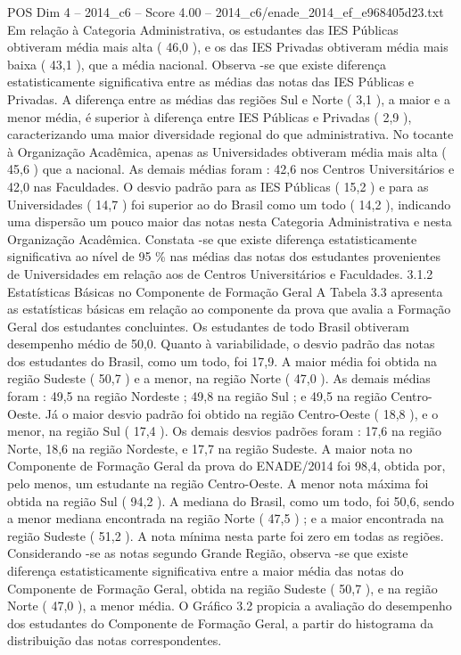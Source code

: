 \begin{textsample}{POS Dim 4 – 2014\_c6 – Score 4.00 – 2014\_c6/enade\_2014\_ef\_e968405d23.txt}
Em relação à Categoria Administrativa, os estudantes das IES Públicas obtiveram média mais alta ( 46,0 ), e os das IES Privadas obtiveram média mais baixa ( 43,1 ), que a média nacional.
Observa -se que existe diferença estatisticamente significativa entre as médias das notas das IES Públicas e Privadas.
A diferença entre as médias das regiões Sul e Norte ( 3,1 ), a maior e a menor média, é superior à diferença entre IES Públicas e Privadas ( 2,9 ), caracterizando uma maior diversidade regional do que administrativa.
No tocante à Organização Acadêmica, apenas as Universidades obtiveram média mais alta ( 45,6 ) que a nacional.
As demais médias foram : 42,6 nos Centros Universitários e 42,0 nas Faculdades.
O desvio padrão para as IES Públicas ( 15,2 ) e para as Universidades ( 14,7 ) foi superior ao do Brasil como um todo ( 14,2 ), indicando uma dispersão um pouco maior das notas nesta Categoria Administrativa e nesta Organização Acadêmica.
Constata -se que existe diferença estatisticamente significativa ao nível de 95 \% nas médias das notas dos estudantes provenientes de Universidades em relação aos de Centros Universitários e Faculdades. 3.1.2 Estatísticas Básicas no Componente de Formação Geral A Tabela 3.3 apresenta as estatísticas básicas em relação ao componente da prova que avalia a Formação Geral dos estudantes concluintes.
Os estudantes de todo Brasil obtiveram desempenho médio de 50,0.
Quanto à variabilidade, o desvio padrão das notas dos estudantes do Brasil, como um todo, foi 17,9.
A maior média foi obtida na região Sudeste ( 50,7 ) e a menor, na região Norte ( 47,0 ).
As demais médias foram : 49,5 na região Nordeste ; 49,8 na região Sul ; e 49,5 na região Centro-Oeste.
Já o maior desvio padrão foi obtido na região Centro-Oeste ( 18,8 ), e o menor, na região Sul ( 17,4 ).
Os demais desvios padrões foram : 17,6 na região Norte, 18,6 na região Nordeste, e 17,7 na região Sudeste.
A maior nota no Componente de Formação Geral da prova do ENADE/2014 foi 98,4, obtida por, pelo menos, um estudante na região Centro-Oeste.
A menor nota máxima foi obtida na região Sul ( 94,2 ).
A mediana do Brasil, como um todo, foi 50,6, sendo a menor mediana encontrada na região Norte ( 47,5 ) ; e a maior encontrada na região Sudeste ( 51,2 ).
A nota mínima nesta parte foi zero em todas as regiões.
Considerando -se as notas segundo Grande Região, observa -se que existe diferença estatisticamente significativa entre a maior média das notas do Componente de Formação Geral, obtida na região Sudeste ( 50,7 ), e na região Norte ( 47,0 ), a menor média.
O Gráfico 3.2 propicia a avaliação do desempenho dos estudantes do Componente de Formação Geral, a partir do histograma da distribuição das notas correspondentes.

\end{textsample}
